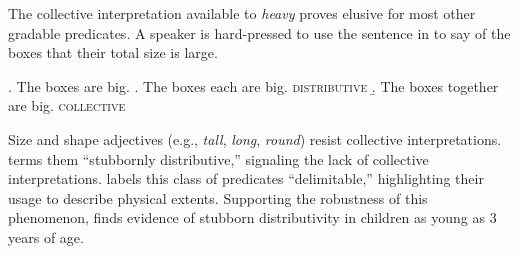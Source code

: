 \documentclass[linguex]{sp}
\begin{document}
The collective interpretation available to \emph{heavy} proves elusive for most other gradable predicates. A speaker is hard-pressed to use the sentence in \Next to say of the boxes that their total size is large.

\ex. The boxes are big.
\a. The boxes each are big. \hfill \textsc{distributive}
\b. The boxes together are big. \hfill {}\textsc{collective}

Size and shape adjectives (e.g., \emph{tall}, \emph{long}, \emph{round}) resist collective interpretations. \cite{schwarzschild2011} terms them ``stubbornly distributive,'' signaling the lack of collective interpretations. \citet{zhang2013} labels this class of predicates ``delimitable,'' highlighting their usage to describe physical extents. Supporting the robustness of this phenomenon, \cite{syrett2015} finds evidence of stubborn distributivity in children as young as 3 years of age.

\end{document}
